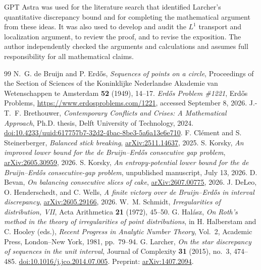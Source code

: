 \documentclass[11pt]{article}
\theoremstyle{remark}
\numberwithin{equation}{section}
\begin{document}
GPT Astra was used for the literature search that
identified Larcher's quantitative discrepancy bound and for completing
the mathematical argument from these ideas. It was also used to develop
and audit the $L^1$ transport and localization argument, to review
the proof, and to revise the exposition. The author independently checked the
arguments and calculations and
assumes full responsibility for all mathematical claims.

\begin{thebibliography}{99}
N.~G. de Bruijn and P. Erd\H{o}s,
\emph{Sequences of points on a circle},
Proceedings of the Section of Sciences of the Koninklijke Nederlandse
Akademie van Wetenschappen te Amsterdam
\textbf{52} (1949), 14--17.
\emph{Erd\H{o}s Problem \#1221},
Erd\H{o}s Problems,
\url{https://www.erdosproblems.com/1221},
accessed September 8, 2026.
J.-T.~F. Brethouwer,
\emph{Contemporary Conflicts and Crises: A Mathematical Approach},
Ph.D. thesis, Delft University of Technology, 2024.
\href{https://doi.org/10.4233/uuid:617757b7-32d2-4bac-8be3-5a6a13e6e710}{doi:10.4233/uuid:617757b7-32d2-4bac-8be3-5a6a13e6e710}.
F. Cl\'ement and S. Steinerberger,
\emph{Balanced stick breaking},
\href{https://arxiv.org/abs/2511.14637}{arXiv:2511.14637}, 2025.
S. Korsky,
\emph{An improved lower bound for the de Bruijn--Erd\H{o}s consecutive gap problem},
\href{https://arxiv.org/abs/2605.30959}{arXiv:2605.30959}, 2026.
S. Korsky,
\emph{An entropy-potential lower bound for the de Bruijn--Erd\H{o}s
consecutive-gap problem},
unpublished manuscript, July 13, 2026.
D. Bevan,
\emph{On balancing consecutive slices of cake},
\href{https://arxiv.org/abs/2607.00775}{arXiv:2607.00775}, 2026.
J. DeLeo, O. Henderschedt, and C. Wells,
\emph{A finite victory over de Bruijn--Erd\H{o}s in interval discrepancy},
\href{https://arxiv.org/abs/2605.29166}{arXiv:2605.29166}, 2026.
W.~M. Schmidt,
\emph{Irregularities of distribution, VII},
Acta Arithmetica \textbf{21} (1972), 45--50.
G. Hal\'asz,
\emph{On Roth's method in the theory of irregularities of point distributions},
in H. Halberstam and C. Hooley (eds.),
\emph{Recent Progress in Analytic Number Theory}, Vol.~2,
Academic Press, London--New York, 1981, pp.~79--94.
G. Larcher,
\emph{On the star discrepancy of sequences in the unit interval},
Journal of Complexity \textbf{31} (2015), no.~3, 474--485.
\href{https://doi.org/10.1016/j.jco.2014.07.005}{doi:10.1016/j.jco.2014.07.005}.
Preprint: \href{https://arxiv.org/abs/1407.2094}{arXiv:1407.2094}.
\end{thebibliography}
\end{document}
